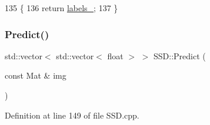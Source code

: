 \begin{DoxyCode}
135 \{
136     \textcolor{keywordflow}{return} \mbox{\hyperlink{class_s_s_d_a1c4d34f2dda5d4ca2dfabbebff7a0ddb}{labels\_}};
137 \}
\end{DoxyCode}
\mbox{\label{class_s_s_d_a58c0ef81b4b24424fd967d90da5c6045}} 
\subsubsection{\texorpdfstring{Predict()}{Predict()}}
{\footnotesize\ttfamily std\+::vector$<$ std\+::vector$<$ float $>$ $>$ S\+S\+D\+::\+Predict (\begin{DoxyParamCaption}\item[{const Mat \&}]{img }\end{DoxyParamCaption})\hspace{0.3cm}{\ttfamily [protected]}}



Definition at line 149 of file S\+S\+D.\+cpp.


